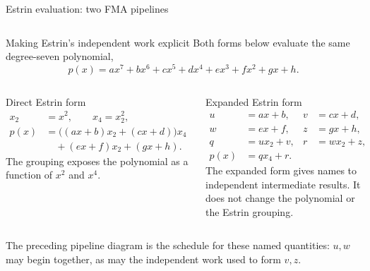 \documentclass[aspectratio=169,11pt]{beamer}
\begin{document}
\begin{frame}[t]{Estrin evaluation: two FMA pipelines}
\begin{columns}[T]
\begin{center}
\end{center}
\end{columns}
\end{frame}

\begin{frame}{Making Estrin's independent work explicit}
\small
Both forms below evaluate the same degree-seven polynomial,
\[
  p(x)=a x^7+b x^6+c x^5+d x^4+e x^3+f x^2+g x+h.
\]
\begin{columns}[T,onlytextwidth]
\begin{block}{Direct Estrin form}
\[
\begin{aligned}
x_2&=x^2, \qquad x_4=x_2^2,\\
p(x)&=\big((ax+b)x_2+(cx+d)\big)x_4\\
&\quad +(ex+f)x_2+(gx+h).
\end{aligned}
\]
The grouping exposes the polynomial as a function of $x^2$ and $x^4$.
\end{block}
\begin{block}{Expanded Estrin form}
\[
\begin{aligned}
u&=ax+b, &v&=cx+d,\\
w&=ex+f, &z&=gx+h,\\
q&=ux_2+v, &r&=wx_2+z,\\
p(x)&=qx_4+r.
\end{aligned}
\]
The expanded form gives names to independent intermediate results.  It does
not change the polynomial or the Estrin grouping.
\end{block}
\end{columns}
The preceding pipeline diagram is the schedule for these named quantities:
$u,w$ may begin together, as may the independent work used to form $v,z$.
\end{frame}
\end{document}
